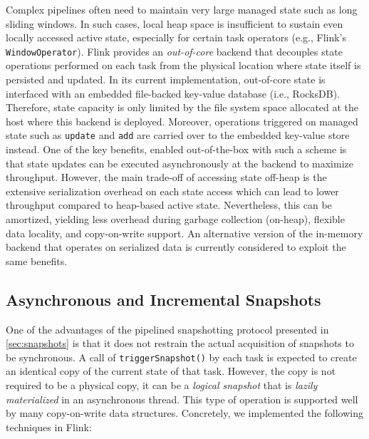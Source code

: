 Complex pipelines often need to maintain very large managed state such as long sliding windows. In such cases, local heap space is insufficient to sustain even locally accessed active state, especially for certain task operators (e.g., Flink's \texttt{WindowOperator}). Flink provides an \emph{out-of-core} backend that decouples state operations performed on each task from the physical location where state itself is persisted and updated. In its current implementation, out-of-core state is interfaced with an embedded file-backed key-value database (i.e., RocksDB). Therefore, state capacity is only limited by the file system space allocated at the host where this backend is deployed. Moreover, operations triggered on managed state such as \texttt{update} and \texttt{add} are carried over to the embedded key-value store instead. One of the key benefits, enabled out-of-the-box with such a scheme is that state updates can be executed asynchronously at the backend to maximize throughput. However, the main trade-off of accessing state off-heap is the extensive serialization overhead on each state access which can lead to lower throughput compared to heap-based active state. Nevertheless, this can be amortized, yielding less overhead during garbage collection (on-heap), flexible data locality, and copy-on-write support. An alternative version of the in-memory backend that operates on serialized data is currently considered to exploit the same benefits.


\subsection{Asynchronous and Incremental Snapshots}
\label{sec:async}
One of the advantages of the pipelined snapshotting protocol presented in \autoref{sec:snapshots} is that it does not restrain the actual acquisition of snapshots to be synchronous. A call of \texttt{triggerSnapshot()} by each task is expected to create an identical copy of the current state of that task. However, the copy is not required to be a physical copy, it can be a \emph{logical snapshot} that is \emph{lazily materialized} in an asynchronous thread. This type of operation is supported well by many copy-on-write data structures. Concretely, we implemented the following techniques in Flink:

